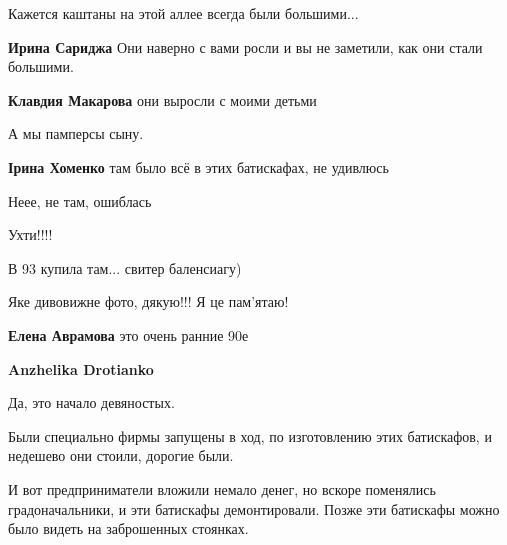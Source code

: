 
 
 
 
 

\qqSecCmt


Кажется каштаны на этой аллее всегда были большими...

\begin{itemize} %
\textbf{Ирина Сариджа} Они наверно с вами росли и вы не заметили, как они стали большими.

\textbf{Клавдия Макарова} они выросли с моими детьми
\end{itemize} %


А мы памперсы сыну.

\begin{itemize} %
\textbf{Ірина Хоменко} там было всё в этих батискафах, не удивлюсь
\end{itemize} %

Неее, не там, ошиблась


Ухти!!!!


В 93 купила там... свитер баленсиагу)


Яке дивовижне фото, дякую!!! Я це пам'ятаю!

\begin{itemize} %
\textbf{Елена Аврамова} это очень ранние 90е

\textbf{Anzhelika Drotianko}

Да, это начало девяностых.

Были специально фирмы запущены в ход, по изготовлению этих батискафов, и
недешево они стоили, дорогие были.

И вот предприниматели вложили немало денег, но вскоре поменялись
градоначальники, и эти батискафы демонтировали. Позже эти батискафы можно было
видеть на заброшенных стоянках.

\end{itemize} %

